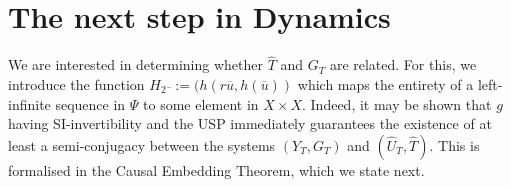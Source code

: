 
\section{The next step in Dynamics}





We are interested in determining whether $\widehat{T}$ and $G_T$ are related. For this, we introduce  the function ${H_2{\overline{}} := (h(r\overline{u}, h(\overline{u}))}$ which maps the entirety of a left-infinite sequence in $\Psi$ to some element in $X\times{X}$. 
Indeed, it may be shown that $g$ having SI-invertibility and the USP immediately guarantees the existence of at least a semi-conjugacy between the systems $(Y_T, G_T)$ and $(\widehat{U}_T, \widehat{T})$.
This is formalised in the Causal Embedding Theorem, which we state next.

